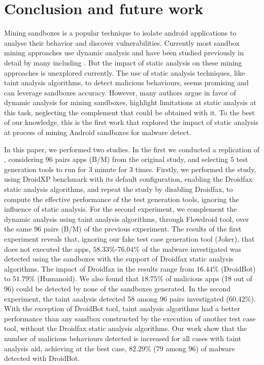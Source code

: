 \section{Conclusion and future work}

Mining sandboxes is a popular technique to isolate android applications to analyse their behavior and discover vulnerabilities. Currently most sandbox mining approaches use dynamic analysis and have been studied previously in detail by many including \blls. But the impact of static analysis on these mining approaches is unexplored currently. The use of static analysis techniques, like taint analysis algorithms, to detect malicious behaviours, seems promising and can leverage sandboxes accuracy. However, many authors argue in favor of dynamic analysis for  mining sandboxes, highlight limitations at static analysis at this task, neglecting the complement that could be obtained with it. To the best of our knowledge, this is the first work that explored the impact of static analysis at process of mining Android sandboxes for malware detect.

In this paper, we performed two studies. In the first we conducted a replication of \blls, considering $96$ pairs apps (B/M) from the original study, and selecting $5$ test generation tools to run for $3$ minute for $3$ times. Firstly, we performed the study, using DroidXP benchmark with its default configuration, enabling the Droidfax static analysis algorithms, and repeat the study by disabling Droidfax, to compute the effective performance of the test generation tools, ignoring the influence of static analysis. For the second experiment, we complement the dynamic analysis using taint analysis algorithms, through Flowdroid tool, over the same $96$ pairs (B/M) of the previous experiment. The results of the first experiment reveals that, ignoring our fake test case generation tool (Joker), that does not executed the apps, $58.33\%$-$76.04\%$ of the malware investigated was detected using the sandboxes with the support of Droidfax static analysis algorithms. The impact of Droidfax in the results range from $16.44\%$ (DroidBot) to $51.79\%$ (Humanoid). We also found that $18.75\%$ of malicious apps (18 out of 96) could be detected by none of the sandboxes generated. In the second experiment, the taint analysis detected 58 among 96 pairs investigated (60.42\%). With the exception of DroidBot tool, taint analysis algorithms had a better performance than any sandbox constructed by the execution of another test case tool, without the Droidfax static analysis algorithms. Our work show that the number of malicious behaviours detected is increased for all cases with taint analysis aid, achieving at the best case, $82.29\%$ (79 among 96) of malware detected with DroidBot.

